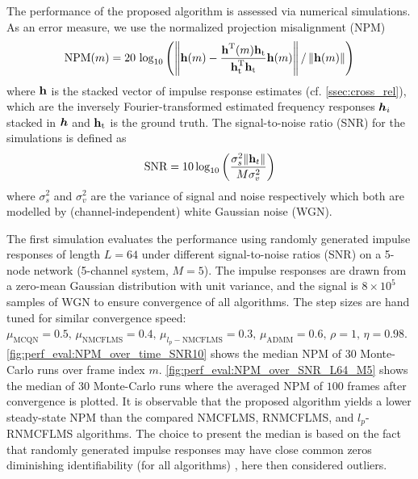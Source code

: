 \documentclass{article}
\begin{document}
The performance of the proposed algorithm is assessed via numerical simulations.
As an error measure, we use the normalized projection misalignment (NPM) \cite{huangClassFrequencydomainAdaptive2003}
\begin{equation}
    \text{NPM}(m) = 20\,\log_{10} \left(\left\| \bm{\mathrm{h}}(m) - \frac{\bm{\mathrm{h}}^{\mathrm{T}} (m) \bm{\mathrm{h}}_{\text{t}}}{\bm{\mathrm{h}}_{\text{t}}^{\mathrm{T}} \bm{\mathrm{h}}_{\text{t}}}\bm{\mathrm{h}}(m) \right\| / \left\|\bm{\mathrm{h}}(m)\right\| \right)
\end{equation}
where \(\bm{\mathrm{h}}\) is the stacked vector of impulse response estimates (cf. \autoref{ssec:cross_rel}), which are the inversely Fourier-transformed estimated frequency responses \({\bm{h}}_i\) stacked in \({\bm{h}}\) and \(\bm{\mathrm{h}}_{\text{t}}\) is the ground truth. The signal-to-noise ratio (SNR) for the simulations is defined as 
\begin{equation}
    \text{SNR} = 10 \log_{10} \left(\frac{\sigma_s^2 \| \bm{\mathrm{h}}_t \|}{M \sigma_v^2} \right)
\end{equation}
where \(\sigma_s^2\) and \(\sigma_v^2\) are the variance of signal and noise respectively which both are modelled by (channel-independent) white Gaussian noise (WGN).

The first simulation evaluates the performance using randomly generated impulse responses of length \(L=64\) under different signal-to-noise ratios (SNR) on a 5-node network (5-channel system, \(M=5\)).
The impulse responses are drawn from a zero-mean Gaussian distribution with unit variance, and the signal is \(8 \times 10^{5}\) samples of WGN to ensure convergence of all algorithms.
The step sizes are hand tuned for similar convergence speed: \(\mu_{\text{MCQN}}=0.5,\, \mu_{\text{NMCFLMS}}=0.4,\, \mu_{l_p-\text{NMCFLMS}}=0.3,\, \mu_{\text{ADMM}}=0.6,\, \rho=1,\,\eta=0.98 \).
\autoref{fig:perf_eval:NPM_over_time_SNR10} shows the median NPM of 30 Monte-Carlo runs over frame index \(m\).
\autoref{fig:perf_eval:NPM_over_SNR_L64_M5} shows the median of 30 Monte-Carlo runs where the averaged NPM of \(100\) frames after convergence is plotted.
It is observable that the proposed algorithm yields a lower steady-state NPM than the compared NMCFLMS, RNMCFLMS, and \(l_p\)-RNMCFLMS algorithms.
The choice to present the median is based on the fact that randomly generated impulse responses may have close common zeros diminishing identifiability (for all algorithms) \cite{naylorNearCommonZerosBlind2008}, here then considered outliers.
\end{document}
